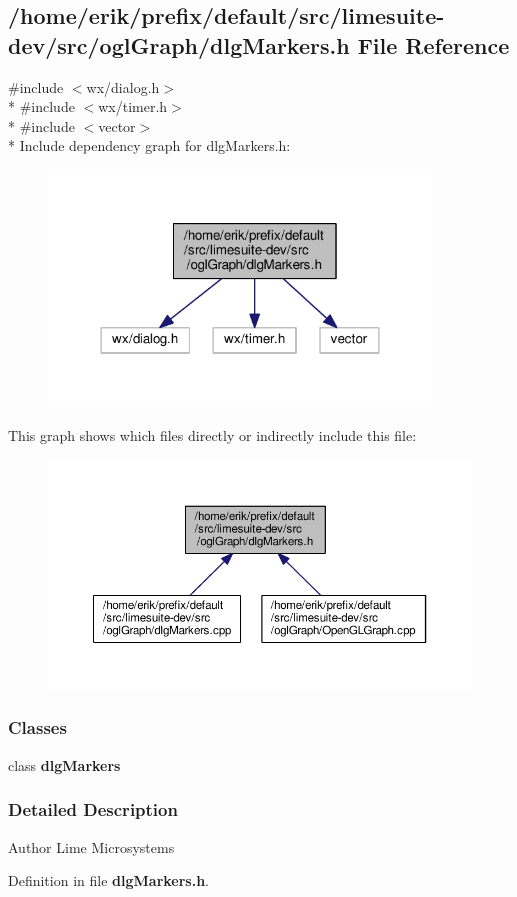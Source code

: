 \subsection{/home/erik/prefix/default/src/limesuite-\/dev/src/ogl\+Graph/dlg\+Markers.h File Reference}
\label{dlgMarkers_8h}
{\ttfamily \#include $<$wx/dialog.\+h$>$}\\*
{\ttfamily \#include $<$wx/timer.\+h$>$}\\*
{\ttfamily \#include $<$vector$>$}\\*
Include dependency graph for dlg\+Markers.\+h\+:
\nopagebreak
\begin{figure}[H]
\begin{center}
\leavevmode
\includegraphics[width=288pt]{dc/d0c/dlgMarkers_8h__incl}
\end{center}
\end{figure}
This graph shows which files directly or indirectly include this file\+:
\nopagebreak
\begin{figure}[H]
\begin{center}
\leavevmode
\includegraphics[width=350pt]{d4/dcc/dlgMarkers_8h__dep__incl}
\end{center}
\end{figure}
\subsubsection*{Classes}
\begin{DoxyCompactItemize}
\item 
class {\bf dlg\+Markers}
\end{DoxyCompactItemize}


\subsubsection{Detailed Description}
\begin{DoxyAuthor}{Author}
Lime Microsystems 
\end{DoxyAuthor}


Definition in file {\bf dlg\+Markers.\+h}.

